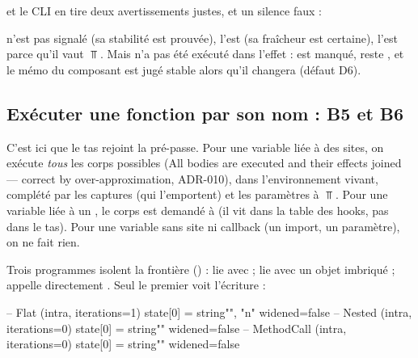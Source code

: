 et le CLI en tire deux avertissements justes, et un silence faux :


 n'est pas signalé (sa stabilité est prouvée),  l'est
(sa fraîcheur est certaine),  l'est parce qu'il vaut $\Top$. Mais
 n'a pas été exécuté dans l'effet :  est manqué,
 reste , et le mémo \code{[q]} du composant est jugé
stable alors qu'il changera (défaut D6).

\subsection{Exécuter une fonction par son nom : B5 et B6}


C'est ici que le tas rejoint la pré-passe. Pour une variable liée à des
sites, on exécute \emph{tous} les corps possibles (\og All bodies are
executed and their effects joined --- correct by over-approximation\fg{},
ADR-010), dans l'environnement vivant, complété par les captures (qui
l'emportent) et les paramètres à $\Top$. Pour une variable liée à un
, le corps est demandé à 
(il vit dans la table des hooks, pas dans le tas). Pour une variable sans
site ni callback (un import, un paramètre), on ne fait rien.

Trois programmes isolent la frontière () :
 lie  avec  ;
 lie  avec un objet imbriqué ;
 appelle directement . Seul le premier voit
l'écriture :

\begin{sortie}
-- Flat (intra, iterations=1)
   state[0] = string{"", "n"}   widened=false
-- Nested (intra, iterations=0)
   state[0] = string{""}   widened=false
-- MethodCall (intra, iterations=0)
   state[0] = string{""}   widened=false
\end{sortie}

